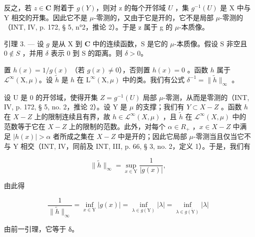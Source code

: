 反之，若 \(z \in \mathbf{C}\) 附着于 \(g(Y)\)，则对 z 的每个开邻域 \(U\) ，集 \(g^{-1}(U)\) 是 X 中与 Y 相交的开集。因此它不是 \(\mu\)-零测的，又由于它是开的，它不是局部 \(\mu\)-零测的（INT, IV, p. 172, § 5, n°2，推论 2）。于是 z 属于 g 的 \(\mu\)-本质像。

引理 3. --- 设 \(g\) 是从 X 到 \(\mathbf{C}\) 中的连续函数，S 是它的 \(\mu\)-本质像。假设 S 非空且 \(0 \notin S\) ，并用 \(\delta\) 表示 0 到 S 的距离。则 \(\delta > 0\)。

置 \(h(x) = 1 / g(x)\) （若 \(g(x) \neq 0\)），否则置 \(h(x) = 0\) 。函数 \(h\) 属于 \(\mathcal{L}^{\infty}(\mathrm{X},\mu)\)。设 \(\widetilde{h}\) 是 \(h\) 在 \(\mathrm{L}^{\infty}(\mathrm{X},\mu)\) 中的类。我们有公式 \(\delta^{-1} = \| \widetilde{h}\|_{\infty}\) 。

设 U 是 0 的开邻域，使得开集 \(Z = g^{-1}(U)\) 局部 \(\mu\)-零测，从而是零测的（INT, IV, p. 172, § 5, no. 2，推论 2）。设 Y 是 \(\mu\) 的支撑；我们有 \(Y \subset X - Z\) 。函数 \(h\) 在 \(X - Z\) 上的限制连续且有界，故 \(h \in \mathcal{L}^{\infty}(X, \mu)\) ，且 \(\widetilde{h}\) 在 \(\mathcal{L}^{\infty}(X, \mu)\) 中的范数等于它在 \(X - Z\) 上的限制的范数。此外，对每个 \(\alpha \in R_{+}\) ，\(x \in X - Z\) 中满足 \(|h(x)| > \alpha\) 者所成之集在 \(X - Z\) 中是开的；因此它局部 \(\mu\)-零测当且仅当它不与 Y 相交（INT, IV，同前及 INT, III, p. 66, § 3, no. 2，定义 1）。于是，我们有

\[
\| \widetilde {h} \| _ {\infty} = \sup _ {x \in \mathrm{Y}} \frac {1}{| g (x) |},
\]

由此得

\[
\frac {1}{\| \widetilde {h} \| _ {\infty}} = \inf _ {x \in \mathrm{Y}} | g (x) | = \inf _ {\lambda \in g (\mathrm{Y})} | \lambda | = \inf _ {\lambda \in \overline {{g (\mathrm{Y})}}} | \lambda |
\]

由前一引理，它等于 δ。

